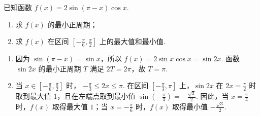 \begin{problem}
已知函数 \( f(x) = 2\sin (\pi - x)\cos x \).
\begin{enumerate}
\item 求 \( f(x) \) 的最小正周期；
\item 求 \( f(x) \) 在区间 \( \left[-\frac{\pi}{6}, \frac{\pi}{2}\right] \) 上的最大值和最小值.
\end{enumerate}

\begin{solution}
\begin{enumerate}
\item 因为 \(\sin(\pi-x)=\sin x\)，所以
\(f(x)=2\sin x\cos x=\sin 2x\).
函数 \(\sin 2x\) 的最小正周期 \(T\) 满足 \(2T=2\pi\)，故 \(T=\pi\).

\item 当 \(x\in\left[-\frac{\pi}{6},\frac{\pi}{2}\right]\) 时，
\(-\frac{\pi}{3}\leqslant 2x\leqslant\pi\).
在区间 \(\left[-\frac{\pi}{3},\pi\right]\) 上，\(\sin 2x\) 在 \(2x=\frac{\pi}{2}\) 时取到最大值 \(1\)，且在左端点取到最小值 \(\sin\left(-\frac{\pi}{3}\right)=-\frac{\sqrt{3}}{2}\).
因此，当 \(x=\frac{\pi}{4}\) 时，\(f(x)\) 取得最大值 \(1\)；当 \(x=-\frac{\pi}{6}\) 时，\(f(x)\) 取得最小值 \(-\frac{\sqrt{3}}{2}\).
\end{enumerate}
\end{solution}
\end{problem}

